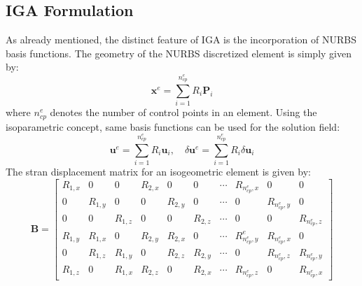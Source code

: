 \documentclass[12pt, a4paper]{report}
\begin{document}
\subsection{IGA Formulation}
As already mentioned, the distinct feature of IGA is the incorporation of NURBS basis functions. The geometry of the NURBS discretized element is simply given by:
\begin{equation}
    \mathbf{x}^{e}=\sum_{i=1}^{n_{c p}^{e}} R_{i} \mathbf{P}_{i}
\end{equation}
where $n_{c p}^{e}$ denotes the number of control points in an element. Using the isoparametric concept, same basis functions can be used for the solution field:
\begin{equation} \label{eq: iso_par}
    \mathbf{u}^{e}=\sum_{i=1}^{n_{c p}^{e}} R_{i} \mathbf{u}_{i}, \quad \delta \mathbf{u}^{e}=\sum_{i=1}^{n_{c p}^{e}} R_{i} \delta \mathbf{u}_{i}
\end{equation}
The stran displacement matrix for an isogeometric element is given by:
\begin{equation} \label{eq: b_mtx}
    \mathbf{B}=\left[\begin{array}{llllllllll}R_{1, x} & 0 & 0 & R_{2, x} & 0 & 0 & \cdots & R_{n_{c p}^{e}, x} & 0 & 0 \\ 0 & R_{1, y} & 0 & 0 & R_{2, y} & 0 & \cdots & 0 & R_{n_{c p}^{e}, y} & 0 \\ 0 & 0 & R_{1, z} & 0 & 0 & R_{2, z} & \cdots & 0 & 0 & R_{n_{c p}^{e}, z} \\ R_{1, y} & R_{1, x} & 0 & R_{2, y} & R_{2, x} & 0 & \cdots & R_{n_{c p}^{e}, y}^{e} & R_{n_{c p}^{e}, x} & 0 \\ 0 & R_{1, z} & R_{1, y} & 0 & R_{2, z} & R_{2, y} & \cdots & 0 & R_{n_{c p}^{e}, z} & R_{n_{c p}^{e}, y} \\ R_{1, z} & 0 & R_{1, x} & R_{2, z} & 0 & R_{2, x} & \cdots & R_{n_{c p}^{e}, z} & 0 & R_{n_{c p}^{e}, x}\end{array}\right]
\end{equation}
\end{document}
